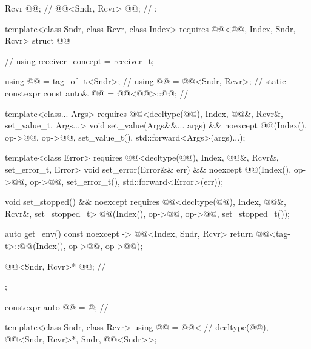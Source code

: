 \begin{codeblock}
{{    Rcvr @@;                                                  // \expos
    @@<Sndr, Rcvr> @@;                               // \expos
  };

  template<class Sndr, class Rcvr, class Index>
    requires @@<@@, Index, Sndr, Rcvr>
  struct @@ {                                       // \expos
    using receiver_concept = receiver_t;

    using @@ = tag_of_t<Sndr>;                               // \expos
    using @@ = @@<Sndr, Rcvr>;                     // \expos
    static constexpr const auto& @@ = @@<@@>::@@;         // \expos

    template<class... Args>
      requires @@<decltype(@@), Index, @@&, Rcvr&, set_value_t, Args...>
    void set_value(Args&&... args) && noexcept {
      @@(Index(), op->@@, op->@@, set_value_t(), std::forward<Args>(args)...);
    }

    template<class Error>
      requires @@<decltype(@@), Index, @@&, Rcvr&, set_error_t, Error>
    void set_error(Error&& err) && noexcept {
      @@(Index(), op->@@, op->@@, set_error_t(), std::forward<Error>(err));
    }

    void set_stopped() && noexcept
      requires @@<decltype(@@), Index, @@&, Rcvr&, set_stopped_t> {
      @@(Index(), op->@@, op->@@, set_stopped_t());
    }

    auto get_env() const noexcept -> @@<Index, Sndr, Rcvr> {
      return @@<tag-t>::@@(Index(), op->@@, op->@@);
    }

    @@<Sndr, Rcvr>* @@;                                // \expos
  };

  constexpr auto @@ = @\seebelownc@;                       // \expos

  template<class Sndr, class Rcvr>
  using @@ = @@<                     // \expos
    decltype(@@), @@<Sndr, Rcvr>*, Sndr, @@<Sndr>>;

}
\end{codeblock}
